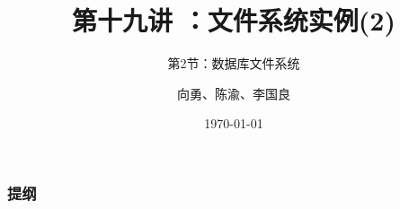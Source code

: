 


\title[第19讲]{第十九讲 ：文件系统实例(2)} %
\subtitle{第2节：数据库文件系统}
\author{向勇、陈渝、李国良} %
\date{\today} %

\usepackage[absolute,overlay]{textpos}



\begin{frame}
\titlepage %
\end{frame}

\begin{frame}
\frametitle{提纲} %
\tableofcontents %

\end{frame}
% 
% 
% 
% 

